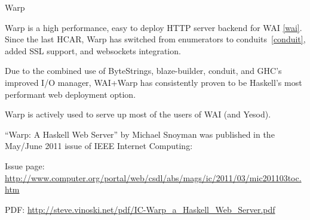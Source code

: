 \begin{hcarentry}{Warp}
\label{warp}
\makeheader

Warp is a high performance, easy to deploy HTTP server backend for
WAI \cref{wai}.  Since the last HCAR, Warp has switched from enumerators to conduits~\cref{conduit}, added SSL support, and websockets integration.

Due to the combined use of ByteStrings, blaze-builder, conduit, and GHC's improved I/O manager, WAI+Warp has consistently proven to be Haskell's most performant web deployment option.

Warp is actively used to serve up most of the users of WAI (and Yesod).

``Warp: A Haskell Web Server'' by Michael Snoyman was published
in the May/June 2011 issue of IEEE Internet Computing:
\begin{compactitem}
\item
 Issue page: \url{http://www.computer.org/portal/web/csdl/abs/mags/ic/2011/03/mic201103toc.htm}
\item
 PDF: \url{http://steve.vinoski.net/pdf/IC-Warp_a_Haskell_Web_Server.pdf}
\end{compactitem}
\end{hcarentry}
